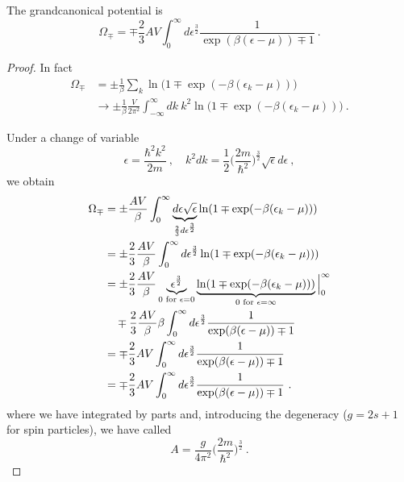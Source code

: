     The grandcanonical potential is 
    \begin{equation*}
        \Omega_\mp = \mp \frac{2}{3}AV \int_0^\infty d \epsilon^{\frac{3}{2}} \frac{1}{\exp(\beta(\epsilon - \mu)) \mp 1}  ~.
    \end{equation*}
    \begin{proof}
        In fact 
        \begin{equation*}
        \begin{aligned}
            \Omega_\mp & = \pm \frac{1}{\beta} \sum_k \ln \Big (1 \mp \exp (-\beta (\epsilon_k - \mu)) \Big) \\ & \rightarrow \pm \frac{1}{\beta} \frac{V}{2\pi^2} \int_{-\infty}^\infty dk ~ k^2 \ln \Big (1 \mp \exp (-\beta (\epsilon_k - \mu)) \Big) ~.
        \end{aligned}
        \end{equation*}

        Under a change of variable 
        \begin{equation*}
            \epsilon = \frac{\hbar^2 k^2}{2m} ~, \quad k^2 dk = \frac{1}{2} \Big (\frac{2m}{\hbar^2}\Big)^{\frac{3}{2}} \sqrt{\epsilon} d\epsilon ~,
        \end{equation*}
        we obtain 
        \begin{equation*}
        \begin{aligned}
            \Omega_\mp & = \pm \frac{AV}{\beta} \int_0^\infty \underbrace{d\epsilon \sqrt{\epsilon}}_{\frac{2}{3} d \epsilon^{\frac{3}{2}}} \ln  (1 \mp \exp (-\beta (\epsilon_k - \mu)) ) \\ & = \pm \frac{2}{3} \frac{AV}{\beta} \int_0^\infty d \epsilon^{\frac{3}{2}} \ln  (1 \mp \exp (-\beta (\epsilon_k - \mu)) ) \\ & = \pm \frac{2}{3} \frac{AV}{\beta} \underbrace{\epsilon^{\frac{3}{2}}}_{0 \textnormal{ for } \epsilon = 0} \underbrace{\ln  (1 \mp \exp (-\beta (\epsilon_k - \mu)))}_{0 \textnormal{ for } \epsilon = \infty} \Big \vert_0^\infty \\ & \quad \mp \frac{2}{3} \frac{AV}{\beta} \beta \int_0^\infty d \epsilon^{\frac{3}{2}} \frac{1}{\exp(\beta(\epsilon - \mu)) \mp 1} \\ & = \mp \frac{2}{3}AV \int_0^\infty d \epsilon^{\frac{3}{2}} \frac{1}{\exp(\beta(\epsilon - \mu)) \mp 1} \\ & = \mp \frac{2}{3} AV \int_0^\infty d \epsilon^{\frac{3}{2}} \frac{1}{\exp(\beta(\epsilon - \mu)) \mp 1} ~.
        \end{aligned}
        \end{equation*}
        where we have integrated by parts and, introducing the degeneracy ($g = 2s+1$ for spin particles), we have called 
        \begin{equation*}
            A = \frac{g}{4\pi^2} \Big (\frac{2m}{\hbar^2}\Big)^{\frac{3}{2}} ~. 
        \end{equation*}
    \end{proof}

